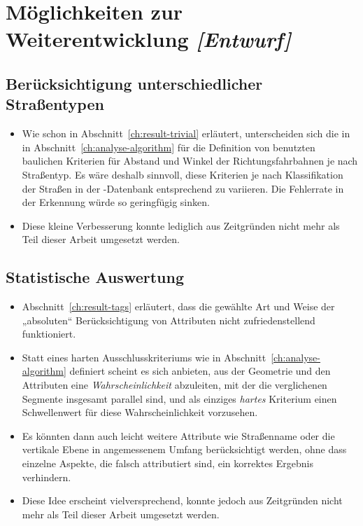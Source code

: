 \documentclass[../main/thesis.tex]{subfiles}
\begin{document}
\section{Möglichkeiten zur Weiterentwicklung \emph{[Entwurf]}}



\subsection{Berücksichtigung unterschiedlicher Straßentypen}

\begin{itemize}

\item
Wie schon in Abschnitt~\ref{ch:result-trivial} erläutert, unterscheiden sich die in in Abschnitt~\ref{ch:analyse-algorithm} für die Definition von  benutzten baulichen Kriterien für Abstand und Winkel der Richtungsfahrbahnen je nach Straßentyp.
Es wäre deshalb sinnvoll, diese Kriterien je nach Klassifikation der Straßen in der \osm-Datenbank entsprechend zu variieren. Die Fehlerrate in der Erkennung würde so geringfügig sinken.

\item
Diese kleine Verbesserung konnte lediglich aus Zeitgründen nicht mehr als Teil dieser Arbeit umgesetzt werden.

\end{itemize}



\subsection{Statistische Auswertung}

\begin{itemize}

\item
Abschnitt~\ref{ch:result-tags} erläutert, dass die gewählte Art und Weise der „absoluten“ Berücksichtigung von Attributen nicht zufriedenstellend funktioniert.

\item
Statt eines harten Ausschlusskriteriums wie in Abschnitt~\ref{ch:analyse-algorithm} definiert scheint es sich anbieten, aus der Geometrie und den Attributen eine \emph{Wahrscheinlichkeit} abzuleiten, mit der die verglichenen Segmente insgesamt parallel sind, und als einziges \emph{hartes} Kriterium einen Schwellenwert für diese Wahrscheinlichkeit vorzusehen.

\item
Es könnten dann auch leicht weitere Attribute wie Straßenname oder die vertikale Ebene in angemessenem Umfang berücksichtigt werden, ohne dass einzelne Aspekte, die falsch attributiert sind, ein korrektes Ergebnis verhindern.

\item
Diese Idee erscheint vielversprechend, konnte jedoch aus Zeitgründen nicht mehr als Teil dieser Arbeit umgesetzt werden.

\end{itemize}
\end{document}
